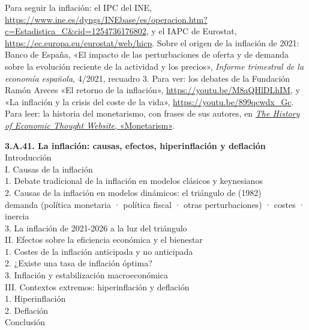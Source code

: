 \documentclass[11pt]{article}
\begin{document}
\begin{anotaciones}
Para seguir la inflación: el IPC del INE, \url{https://www.ine.es/dyngs/INEbase/es/operacion.htm?c=Estadistica_C&cid=1254736176802}, y el IAPC de Eurostat, \url{https://ec.europa.eu/eurostat/web/hicp}. Sobre el origen de la inflación de 2021: Banco de España, «El impacto de las perturbaciones de oferta y de demanda sobre la evolución reciente de la actividad y los precios», \emph{Informe trimestral de la economía española}, 4/2021, recuadro 3\nocite{BdE2021Recuadro3}. Para ver: los debates de la Fundación Ramón Areces «El retorno de la inflación», \url{https://youtu.be/M8aQHlDLhIM}, y «La inflación y la crisis del coste de la vida», \url{https://youtu.be/899qcwdx_Gc}. Para leer: la historia del monetarismo, con frases de sus autores, en \href{https://www.hetwebsite.net/het/essays/monetarism/monetarism.htm}{\emph{The History of Economic Thought Website}, «Monetarism»}.
\end{anotaciones}

\begin{esquema}[unbreakable]
\textbf{3.A.41. La inflación: causas, efectos, hiperinflación y deflación}\\[2pt]
Introducción\\
I. Causas de la inflación\\
\hspace*{1.5em}1. Debate tradicional de la inflación en modelos clásicos y keynesianos\\
\hspace*{1.5em}2. Causas de la inflación en modelos dinámicos: el triángulo de  (1982)\\
\hspace*{3em}demanda (política monetaria · política fiscal · otras perturbaciones) · costes · inercia\\
\hspace*{1.5em}3. La inflación de 2021-2026 a la luz del triángulo\\
II. Efectos sobre la eficiencia económica y el bienestar\\
\hspace*{1.5em}1. Costes de la inflación anticipada y no anticipada\\
\hspace*{1.5em}2. ¿Existe una tasa de inflación óptima?\\
\hspace*{1.5em}3. Inflación y estabilización macroeconómica\\
III. Contextos extremos: hiperinflación y deflación\\
\hspace*{1.5em}1. Hiperinflación\\
\hspace*{1.5em}2. Deflación\\
Conclusión
\end{esquema}
\end{document}
